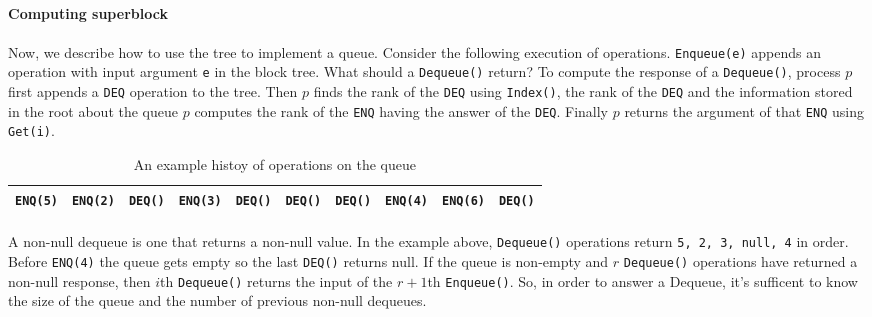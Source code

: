 \documentclass[10pt]{article}
\theoremstyle{definition}
\begin{document}
\paragraph{Computing superblock}


\paragraph{}
Now, we describe how to use the tree to implement a queue. Consider the following execution of operations. \texttt{Enqueue(e)} appends an operation with input argument \texttt{e} in the block tree. What should a \texttt{Dequeue()} return? To compute the response of a \texttt{Dequeue()}, process $p$ first appends a \texttt{DEQ} operation to the tree. Then $p$ finds the rank of the \texttt{DEQ} using \texttt{Index()}, the rank of the \texttt{DEQ} and the information stored in the root about the queue $p$ computes the rank of  the \texttt{ENQ} having the answer of the \texttt{DEQ}. Finally $p$ returns the argument of that \texttt{ENQ} using \texttt{Get(i)}.

\begin{table}[hbt]
\centering
  \begin{tabular}{c|c|c|c|c|c|c|c|c|c}
    \hline \texttt{ENQ(5)}& \texttt{ENQ(2)}& \texttt{DEQ()}& \texttt{ENQ(3)}&\texttt{DEQ()}& \texttt{DEQ()}& \texttt{DEQ()}& \texttt{ENQ(4)}& \texttt{ENQ(6)}& \texttt{DEQ()}\\ \hline
  \end{tabular}
  \caption{An example histoy of operations on the queue}
\end{table}



\paragraph{}
A non-null dequeue is one that returns a non-null value. In the example above, \texttt{Dequeue()} operations return \texttt{5, 2, 3, null, 4} in order. Before \texttt{ENQ(4)} the queue gets empty so the last \texttt{DEQ()} returns null. If the queue is non-empty and $r$ \texttt{Dequeue()} operations have returned a non-null response, then $i$th \texttt{Dequeue()} returns the input of the $r+1$th \texttt{Enqueue()}. So, in order to answer a Dequeue, it's sufficent to know the size of the queue and the number of previous non-null dequeues.
\end{document}
